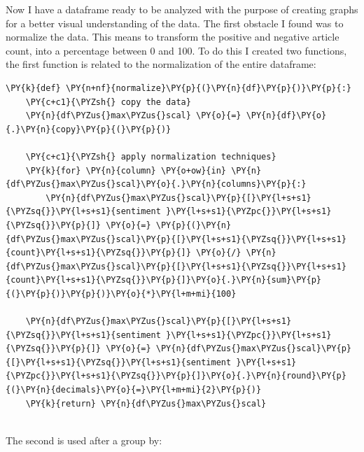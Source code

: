 Now I have a dataframe ready to be analyzed with the purpose of creating graphs for a better visual understanding of the data.
The first obstacle I found was to normalize the data. This means to transform the positive and negative article count, into a percentage between 0 and 100.
To do this I created two functions, the first function is related to the normalization of the entire dataframe:
\begin{tcolorbox}[breakable, size=fbox, boxrule=1pt, pad at break*=1mm,colback=cellbackground, colframe=cellborder]
\begin{Verbatim}[commandchars=\\\{\},fontsize=\footnotesize]
\PY{k}{def} \PY{n+nf}{normalize}\PY{p}{(}\PY{n}{df}\PY{p}{)}\PY{p}{:}
    \PY{c+c1}{\PYZsh{} copy the data}
    \PY{n}{df\PYZus{}max\PYZus{}scal} \PY{o}{=} \PY{n}{df}\PY{o}{.}\PY{n}{copy}\PY{p}{(}\PY{p}{)}

    \PY{c+c1}{\PYZsh{} apply normalization techniques}
    \PY{k}{for} \PY{n}{column} \PY{o+ow}{in} \PY{n}{df\PYZus{}max\PYZus{}scal}\PY{o}{.}\PY{n}{columns}\PY{p}{:}
        \PY{n}{df\PYZus{}max\PYZus{}scal}\PY{p}{[}\PY{l+s+s1}{\PYZsq{}}\PY{l+s+s1}{sentiment }\PY{l+s+s1}{\PYZpc{}}\PY{l+s+s1}{\PYZsq{}}\PY{p}{]} \PY{o}{=} \PY{p}{(}\PY{n}{df\PYZus{}max\PYZus{}scal}\PY{p}{[}\PY{l+s+s1}{\PYZsq{}}\PY{l+s+s1}{count}\PY{l+s+s1}{\PYZsq{}}\PY{p}{]} \PY{o}{/} \PY{n}{df\PYZus{}max\PYZus{}scal}\PY{p}{[}\PY{l+s+s1}{\PYZsq{}}\PY{l+s+s1}{count}\PY{l+s+s1}{\PYZsq{}}\PY{p}{]}\PY{o}{.}\PY{n}{sum}\PY{p}{(}\PY{p}{)}\PY{p}{)}\PY{o}{*}\PY{l+m+mi}{100}
        
    \PY{n}{df\PYZus{}max\PYZus{}scal}\PY{p}{[}\PY{l+s+s1}{\PYZsq{}}\PY{l+s+s1}{sentiment }\PY{l+s+s1}{\PYZpc{}}\PY{l+s+s1}{\PYZsq{}}\PY{p}{]} \PY{o}{=} \PY{n}{df\PYZus{}max\PYZus{}scal}\PY{p}{[}\PY{l+s+s1}{\PYZsq{}}\PY{l+s+s1}{sentiment }\PY{l+s+s1}{\PYZpc{}}\PY{l+s+s1}{\PYZsq{}}\PY{p}{]}\PY{o}{.}\PY{n}{round}\PY{p}{(}\PY{n}{decimals}\PY{o}{=}\PY{l+m+mi}{2}\PY{p}{)}
    \PY{k}{return} \PY{n}{df\PYZus{}max\PYZus{}scal}
    
\end{Verbatim}
\end{tcolorbox}
The second is used after a group by:


